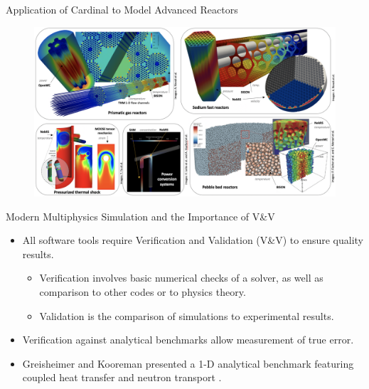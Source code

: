 \documentclass[9pt,t,aspectratio=169]{beamer}
\begin{document}
\begin{frame}{Application of Cardinal to Model Advanced Reactors}
    \vspace*{-0.35cm}
    \begin{figure}[H]
        \centering
        \includegraphics[width=0.8\linewidth]{figures/cardinal_apps.png}
    \end{figure}
\end{frame}

\begin{frame}{Modern Multiphysics Simulation and the Importance of V\&V}
    \pause
    \begin{itemize}
        \item <2-> All software tools require Verification and Validation (V\&V) to ensure quality results.
        \begin{itemize}
            \item <3-> Verification involves basic numerical checks of a solver, as well as comparison to other codes or to physics theory.
            \item <4-> Validation is the comparison of simulations to experimental results.
        \end{itemize}
        \item <5-> Verification against analytical benchmarks allow measurement of true error.
        \item <6-> Greisheimer and Kooreman presented a 1-D analytical benchmark featuring coupled heat transfer and neutron transport \cite{analytical-benchmark}.
    \end{itemize}
\end{frame}


\end{document}

